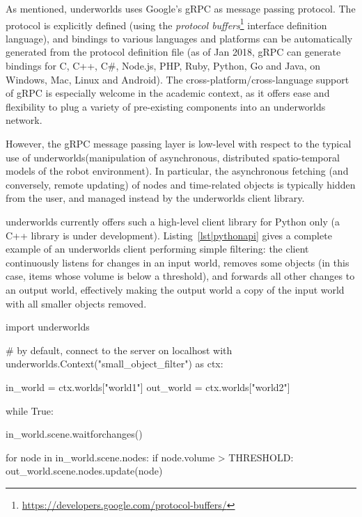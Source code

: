 \documentclass[letterpaper, 10pt, conference]{ieeeconf}
\newcommand{\uwds}{{\sc underworlds}\xspace}
\begin{document}
As mentioned, \uwds uses Google's gRPC as message passing protocol. The protocol
is explicitly defined (using the \emph{protocol
buffers}\footnote{\url{https://developers.google.com/protocol-buffers/}}
interface definition language), and bindings to various languages and platforms
can be automatically generated from the protocol definition file (as of Jan
2018, gRPC can generate bindings for C, C++, C\#, Node.js, PHP, Ruby, Python, Go
and Java, on Windows, Mac, Linux and Android).  The cross-platform/cross-language support
of gRPC is especially welcome in the academic context, as it offers ease and
flexibility to plug a variety of pre-existing components into an \uwds network.


However, the gRPC message passing layer is low-level with respect to the typical
use of \uwds (manipulation of asynchronous, distributed spatio-temporal models
of the robot environment). In particular, the asynchronous fetching (and
conversely, remote updating) of nodes and time-related objects is typically
hidden from the user, and managed instead by the \uwds client library.

\uwds currently offers such a high-level client library for Python only (a C++
library is under development).  Listing~\ref{lst|pythonapi} gives a complete
example of an \uwds client performing simple filtering: the client continuously
listens for changes in an input world, removes some objects (in this case, items
whose volume is below a threshold), and forwards all other changes to
an output world, effectively making the output world a copy of the input world
with all smaller objects removed.

\begin{listing}[h!]

\begin{pythoncode}
import underworlds

# by default, connect to the server on localhost
with underworlds.Context("small_object_filter") as ctx:

    in_world = ctx.worlds["world1"]
    out_world = ctx.worlds["world2"]

    while True:

        in_world.scene.waitforchanges()

        for node in in_world.scene.nodes:
            if node.volume > THRESHOLD:
                out_world.scene.nodes.update(node)


\end{pythoncode}
    \caption{Example of a simple yet complete \uwds filter, written in Python:
    the client connects to the \uwds network, blocks until the world {\tt
    example\_in} changes, and only propagate nodes that match the condition to
    the world {\tt example\_out}.}

    \label{lst|pythonapi}
\end{listing}
\end{document}
